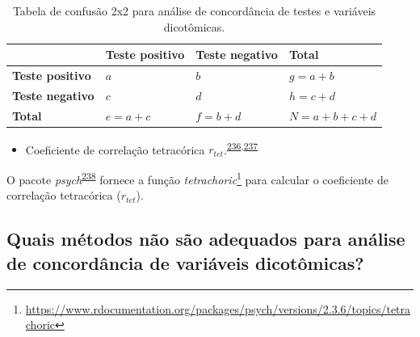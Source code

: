 \documentclass[
  a4paper,
]{book}
\providecommand{\tightlist}{%
  \setlength{\itemsep}{0pt}\setlength{\parskip}{0pt}}
\renewcommand{\href}[2]{#2\footnote{\url{#1}}}
\newenvironment{infobox}[1]
  {
  \begin{itemize}
  \renewcommand{\labelitemi}{
    \raisebox{-.7\height}[0pt][0pt]{
      {\setkeys{Gin}{width=3em,keepaspectratio}
        \texttt{[image: \#1]}}
    }
  }
  \setlength{\fboxsep}{1em}
  \begin{blackbox}
  \item
  }
  {
  \end{blackbox}
  \end{itemize}
  }
\begin{document}
\begin{table}

\caption{\label{tab:crosstable-kappa-2x2}Tabela de confusão 2x2 para análise de concordância de testes e variáveis dicotômicas.}
\centering
\begin{tabu} to 
\toprule
\textbf{ } & \textbf{Teste positivo} & \textbf{Teste negativo} & \textbf{Total}\\
\midrule
\textbf{Teste positivo} & $a$ & $b$ & $g=a+b$\\
\textbf{Teste negativo} & $c$ & $d$ & $h=c+d$\\
\textbf{Total} & $e=a+c$ & $f=b+d$ & $N=a+b+c+d$\\
\bottomrule
\end{tabu}
\end{table}

\begin{itemize}
\tightlist
\item
  Coeficiente de correlação tetracórica \(r_{tet}\).\textsuperscript{\protect\hyperlink{ref-i.mathe1901}{236},\protect\hyperlink{ref-banerjee1999}{237}}
\end{itemize}

\begin{infobox}{images/Rlogo}
O pacote \emph{psych}\textsuperscript{\protect\hyperlink{ref-psych}{238}} fornece a função \href{https://www.rdocumentation.org/packages/psych/versions/2.3.6/topics/tetrachoric}{\emph{tetrachoric}} para calcular o coeficiente de correlação tetracórica (\(r_{tet}\)).

\end{infobox}

\hypertarget{quais-muxe9todos-nuxe3o-suxe3o-adequados-para-anuxe1lise-de-concorduxe2ncia-de-variuxe1veis-dicotuxf4micas}{%
\subsection{Quais métodos não são adequados para análise de concordância de variáveis dicotômicas?}\label{quais-muxe9todos-nuxe3o-suxe3o-adequados-para-anuxe1lise-de-concorduxe2ncia-de-variuxe1veis-dicotuxf4micas}}
\end{document}
